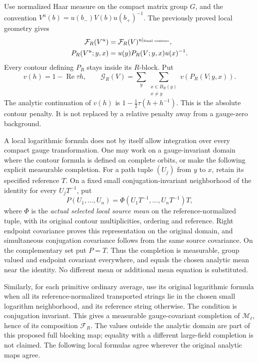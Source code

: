 \documentclass[11pt]{article}
\theoremstyle{remark}
\begin{document}
Use normalized Haar measure on the compact matrix group $G$, and
the convention $V^u(b)=u(b_-)V(b)u(b_+)^{-1}$. The previously
proved local geometry gives
\begin{align}
 \mathcal F_R(V^u)
   &=\mathcal F_R(V)^{u|_{\text{final centers}}},\notag\\
 P_R(V^u;y,x)&=u(y)P_R(V;y,x)u(x)^{-1}.                 \label{cmi-covariance}
\end{align}
Every contour defining $P_R$ stays inside its $R$-block.
Put
\begin{equation}\label{cmi-penalty}
 v(h)=1-\operatorname{Re}\tau h,\qquad
 \mathcal G_R(V)=\sum_y\sum_{\substack{x\in B_R(y)\\x\ne y}}
                       v(P_R(V;y,x)).
\end{equation}
The analytic continuation of $v(h)$ is
$1-\tfrac12\tau(h+h^{-1})$. This is the absolute contour
penalty. It is not replaced by a relative penalty away from
a gauge-zero background.

A local logarithmic formula does not by itself allow integration
over every compact gauge transformation. One may work on a
gauge-invariant domain where the contour formula is defined on
complete orbits, or make the following explicit measurable
completion. For a path tuple $(U_j)$ from $y$ to $x$, retain its
specified reference $T$. On a fixed small conjugation-invariant
neighborhood of the identity for every $U_jT^{-1}$, put
\[
 P(U_1,\ldots,U_n)
   =\Phi(U_1T^{-1},\ldots,U_nT^{-1})T,
\]
where $\Phi$ is the \emph{actual selected local source mean}
on the reference-normalized tuple, with its original contour
multiplicities, ordering and reference. Right endpoint covariance
proves this representation on the original domain, and simultaneous
conjugation covariance follows from the same source covariance.
On the complementary set put $P=T$. Thus the completion is
measurable, group valued and endpoint covariant everywhere,
and equals the chosen analytic mean near the identity. No
different mean or additional mean equation is substituted.

Similarly, for each primitive ordinary average, use its original
logarithmic formula when all its reference-normalized transported
strings lie in the chosen small logarithm neighborhood, and its
reference string otherwise. The condition is conjugation invariant.
This gives a measurable gauge-covariant completion of
$\mathcal M_\ell$, hence of its composition $\mathcal F_R$.
The values outside the analytic domain are part of this proposed
full blocking map; equality with a different large-field completion
is not claimed. The following local formulas agree wherever
the original analytic maps agree.
\end{document}
